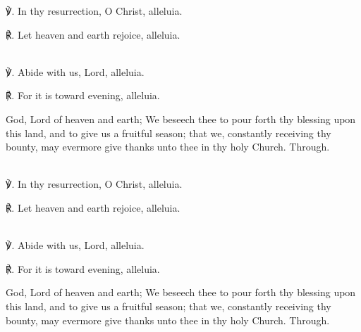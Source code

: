 ℣. In thy resurrection, O Christ, alleluia.

℟. Let heaven and earth rejoice, alleluia.


\secondEvensong
{}\\

℣. Abide with us, Lord, alleluia.

℟. For it is toward evening, alleluia.


\collect
{} God, Lord of heaven and earth; We beseech thee to pour forth thy blessing upon this land, and to give us a fruitful season; that we, constantly receiving thy bounty, may evermore give thanks unto thee in thy holy Church. Through.



\mattins
{}\\

℣. In thy resurrection, O Christ, alleluia.

℟. Let heaven and earth rejoice, alleluia.


\secondEvensong
{}\\

℣. Abide with us, Lord, alleluia.

℟. For it is toward evening, alleluia.


\collect
{} God, Lord of heaven and earth; We beseech thee to pour forth thy blessing upon this land, and to give us a fruitful season; that we, constantly receiving thy bounty, may evermore give thanks unto thee in thy holy Church. Through.



